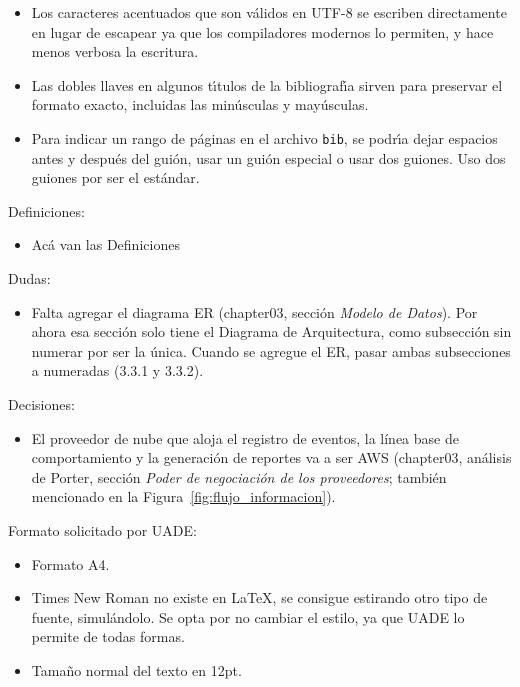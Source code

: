 \begin{itemize}
    \item Los caracteres acentuados que son v\'alidos en UTF-8 se escriben directamente en lugar de escapear ya que los compiladores modernos lo permiten, y hace menos verbosa la escritura.
    \item Las dobles llaves en algunos t\'{\i}tulos de la bibliograf\'{\i}a sirven para preservar el formato exacto, incluidas las min\'usculas y may\'usculas.
    \item Para indicar un rango de p\'aginas en el archivo \texttt{bib}, se podr\'{\i}a dejar espacios antes y despu\'es del gui\'on, usar un gui\'on especial o usar dos guiones. Uso dos guiones por ser el est\'andar.
\end{itemize}

Definiciones:
\begin{itemize}
    \item Acá van las Definiciones
\end{itemize}

Dudas:
\begin{itemize}
    \item Falta agregar el diagrama ER (chapter03, sección \emph{Modelo de Datos}). Por ahora esa sección solo tiene el Diagrama de Arquitectura, como subsección sin numerar por ser la única. Cuando se agregue el ER, pasar ambas subsecciones a numeradas (3.3.1 y 3.3.2).
\end{itemize}

Decisiones:
\begin{itemize}
    \item El proveedor de nube que aloja el registro de eventos, la línea base de comportamiento y la generación de reportes va a ser AWS (chapter03, análisis de Porter, sección \emph{Poder de negociación de los proveedores}; también mencionado en la Figura~\ref{fig:flujo_informacion}).
\end{itemize}

Formato solicitado por UADE:
\begin{itemize}
    \item Formato A4.
    \item Times New Roman no existe en LaTeX, se consigue estirando otro tipo de fuente, simul\'andolo. Se opta por no cambiar el estilo, ya que UADE lo permite de todas formas.
    \item Tama\~no normal del texto en 12pt.
\end{itemize}